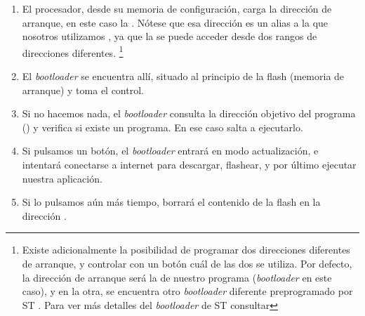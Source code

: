 \documentclass[../main.tex]{subfiles}
\begin{document}
        \begin{enumerate}
            \item El procesador, desde su memoria de configuración, carga la dirección de arranque, en este caso la  \REFMAN[1.9]. Nótese que esa dirección es un alias a la que nosotros utilizamos  \REFMAN[3.3.1], ya que la  se puede acceder desde dos rangos de direcciones diferentes. \footnote{Existe adicionalmente la posibilidad de programar dos direcciones diferentes de arranque, y controlar con un botón cuál de las dos se utiliza. Por defecto, la dirección de arranque será la de nuestro programa (\emph{bootloader} en este caso), y en la otra, se encuentra otro \emph{bootloader} diferente preprogramado por ST \REFMAN[1.9]. Para ver más detalles del \emph{bootloader} de ST consultar \ANMAN}
            \item El \emph{bootloader} se encuentra allí, situado al principio de la flash  (memoria de arranque) y toma el control.
            \item Si no hacemos nada, el \emph{bootloader} consulta la dirección objetivo del programa () y verifica si existe un programa. En ese caso salta a ejecutarlo.
            \item Si pulsamos un botón, el \emph{bootloader} entrará en modo actualización, e intentará conectarse a internet para descargar, flashear, y por último ejecutar nuestra aplicación.
            \item Si lo pulsamos aún más tiempo, borrará el contenido de la flash en la dirección .
        \end{enumerate}
\end{document}
